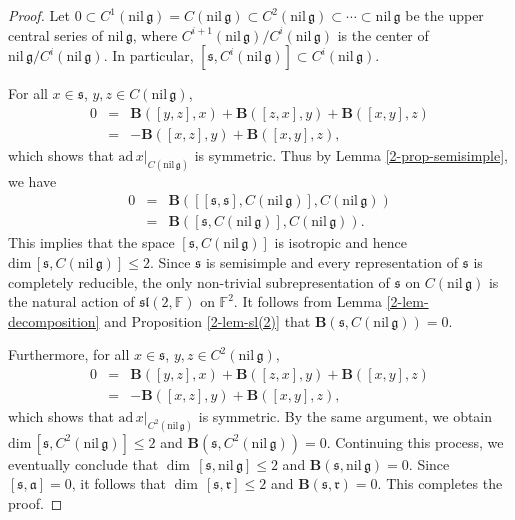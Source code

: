 \documentclass[reqno]{amsart}
\theoremstyle{definition}
\begin{document}
\begin{proof}
Let $0\subset C^{1}(\mathrm{nil}\,\mathfrak{g})=C(\mathrm{nil}\,\mathfrak{g})\subset C^{2}(\mathrm{nil}\,\mathfrak{g})\subset\cdots\subset\mathrm{nil}\,\mathfrak{g}$ be the upper central series of $\mathrm{nil}\,\mathfrak{g}$, where  $C^{i+1}(\mathrm{nil}\,\mathfrak{g})/C^{i}(\mathrm{nil}\,\mathfrak{g})$ is the center of $\mathrm{nil}\,\mathfrak{g}/C^{i}(\mathrm{nil}\,\mathfrak{g})$. In particular, $[\mathfrak{s},C^{i}(\mathrm{nil}\,\mathfrak{g})]\subset C^{i}(\mathrm{nil}\,\mathfrak{g})$.

For all $x\in\mathfrak{s}$, $y,z\in C(\mathrm{nil}\,\mathfrak{g})$,
\begin{eqnarray*}
0&=& \mathbf{B}([y,z],x)+\mathbf{B}([z,x],y)+\mathbf{B}([x,y],z)\\
 &=& -\mathbf{B}([x,z],y)+\mathbf{B}([x,y],z),
\end{eqnarray*}
which shows that $\mathrm{ad}\, x|_{C(\mathrm{nil}\,\mathfrak{g})}$ is symmetric.
Thus by Lemma \ref{2-prop-semisimple}, we have
\begin{eqnarray*}
0&=&\mathbf{B}\left([[\mathfrak{s},\mathfrak{s}],C(\mathrm{nil}\,\mathfrak{g})],C(\mathrm{nil}\,\mathfrak{g})\right)\\
 &=&\mathbf{B}([\mathfrak{s},C(\mathrm{nil}\,\mathfrak{g})],C(\mathrm{nil}\,\mathfrak{g})).
\end{eqnarray*}
This implies that the space $[\mathfrak{s},C(\mathrm{nil}\,\mathfrak{g})]$ is isotropic  and hence $\mathrm{dim}\,[\mathfrak{s},C(\mathrm{nil}\,\mathfrak{g})]\leq 2$.
Since  $\mathfrak{s}$ is semisimple and every representation of $\mathfrak{s}$ is completely reducible,  the only non-trivial subrepresentation of $\mathfrak{s}$ on $C(\mathrm{nil}\,\mathfrak{g})$ is the natural action of $\mathfrak{sl}(2,\mathbb{F})$ on $\mathbb{F}^{2}$.
It follows from Lemma  \ref{2-lem-decomposition} and  Proposition \ref{2-lem-sl(2)}  that
$\mathbf{B}(\mathfrak{s},C(\mathrm{nil}\,\mathfrak{g}))=0$.

Furthermore, for all $x\in\mathfrak{s}$, $y,z\in C^{2}(\mathrm{nil}\,\mathfrak{g})$,
\begin{eqnarray*}
0&=& \mathbf{B}([y,z],x)+\mathbf{B}([z,x],y)+\mathbf{B}([x,y],z)\\
 &=& -\mathbf{B}([x,z],y)+\mathbf{B}([x,y],z),
\end{eqnarray*}
which shows that $\mathrm{ad}\, x|_{C^{2}(\mathrm{nil}\,\mathfrak{g})}$ is symmetric.
 By the same argument, we obtain  $\mathrm{dim}\,[\mathfrak{s},C^{2}(\mathrm{nil}\,\mathfrak{g})]\leq 2$ and
$\mathbf{B}(\mathfrak{s},C^{2}(\mathrm{nil}\,\mathfrak{g}))=0$.
Continuing this process, we eventually conclude that $\dim\,[\mathfrak{s},\mathrm{nil}\,\mathfrak{g}]\leq 2$ and $\mathbf{B}(\mathfrak{s},\mathrm{nil}\,\mathfrak{g})=0$.
Since  $[\mathfrak{s},\mathfrak{a}]=0$, it follows that
$\dim\,[\mathfrak{s},\mathfrak{r}]\leq 2$  and $\mathbf{B}(\mathfrak{s},\mathfrak{r})=0$.  This completes the proof.
\end{proof}
\end{document}
